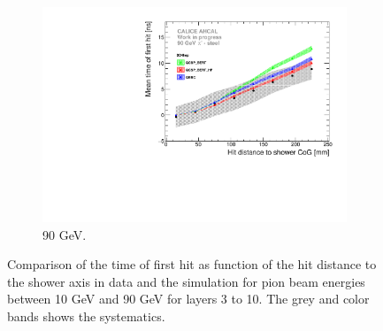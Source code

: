 \begin{figure}[htbp!]
\begin{subfigure}[t]{0.5\textwidth}
    \includegraphics[width=1\textwidth]{../Thesis_Plots/Timing/Pions/Plots/ComparisonToSim/Time_Radius_90GeV_SSF_DD4hep.pdf}
    \caption{90 GeV.} \label{fig:Radius_SSF_SimData_90GeV_DD4hep}
  \end{subfigure}
  \caption{Comparison of the time of first hit as function of the hit distance to the shower axis in data and the \ddhep simulation for pion beam energies between 10 GeV and 90 GeV for layers 3 to 10. The grey and color bands shows the systematics.}
\end{figure}


